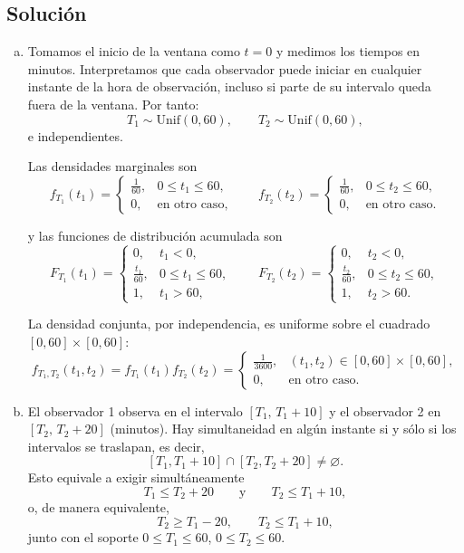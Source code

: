 \documentclass[a4paper]{article}
\begin{document}
\subsection{Solución}
\begin{enumerate}[a.]
\item Tomamos el inicio de la ventana como $t=0$ y medimos los tiempos en minutos. Interpretamos que cada observador puede iniciar en cualquier instante de la hora de observación, incluso si parte de su intervalo queda fuera de la ventana. Por tanto:
$$T_1 \sim \mathrm{Unif}(0,60), \qquad T_2 \sim \mathrm{Unif}(0,60),$$
e independientes.

Las densidades marginales son
$$
f_{T_1}(t_1)=
\begin{cases}
\frac{1}{60}, & 0\le t_1\le 60,\\
0, & \text{en otro caso},
\end{cases}
\qquad
f_{T_2}(t_2)=
\begin{cases}
\frac{1}{60}, & 0\le t_2\le 60,\\
0, & \text{en otro caso}.
\end{cases}
$$

y las funciones de distribución acumulada son
$$
F_{T_1}(t_1)=
\begin{cases}
0, & t_1<0,\\
\frac{t_1}{60}, & 0\le t_1\le 60,\\
1, & t_1>60,
\end{cases}
\qquad
F_{T_2}(t_2)=
\begin{cases}
0, & t_2<0,\\
\frac{t_2}{60}, & 0\le t_2\le 60,\\
1, & t_2>60.
\end{cases}
$$

La densidad conjunta, por independencia, es uniforme sobre el cuadrado $[0,60]\times[0,60]$:
$$
f_{T_1,T_2}(t_1,t_2)=f_{T_1}(t_1)f_{T_2}(t_2)=
\begin{cases}
\frac{1}{3600}, & (t_1,t_2)\in[0,60]\times[0,60],\\
0, & \text{en otro caso}.
\end{cases}
$$

\item El observador 1 observa en el intervalo $[T_1,\,T_1+10]$ y el observador 2 en $[T_2,\,T_2+20]$ (minutos).
Hay simultaneidad en algún instante si y sólo si los intervalos se traslapan, es decir,
$$[T_1,T_1+10]\cap[T_2,T_2+20]\neq\varnothing.$$
Esto equivale a exigir simultáneamente
$$T_1 \le T_2+20 \qquad \text{y} \qquad T_2 \le T_1+10,$$
o, de manera equivalente,
$$T_2 \ge T_1-20, \qquad T_2 \le T_1+10,$$
junto con el soporte $0\le T_1\le 60$, $0\le T_2\le 60$.


\end{enumerate}
\end{document}
